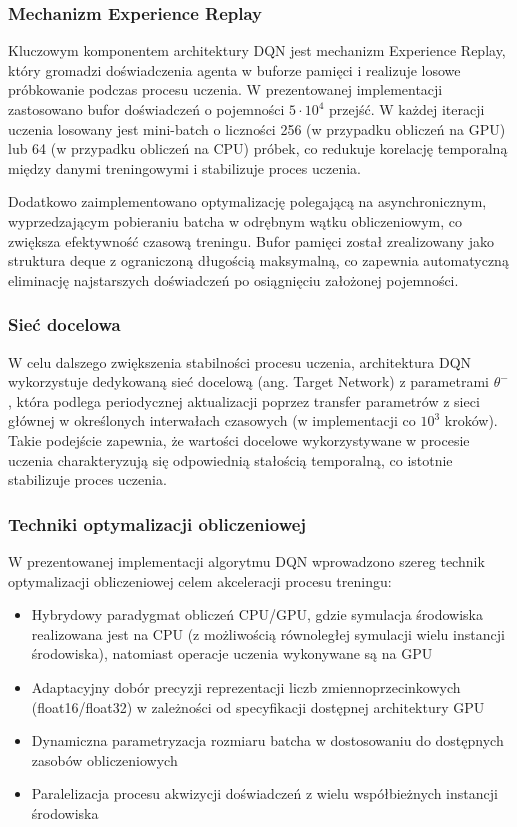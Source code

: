 \documentclass[a4paper,12pt]{article}
\begin{document}
\subsubsection*{Mechanizm Experience Replay}

Kluczowym komponentem architektury DQN jest mechanizm Experience Replay, który gromadzi doświadczenia agenta w buforze pamięci i realizuje losowe próbkowanie podczas procesu uczenia. W prezentowanej implementacji zastosowano bufor doświadczeń o pojemności \(5 \cdot 10^4\) przejść. W każdej iteracji uczenia losowany jest mini-batch o liczności 256 (w przypadku obliczeń na GPU) lub 64 (w przypadku obliczeń na CPU) próbek, co redukuje korelację temporalną między danymi treningowymi i stabilizuje proces uczenia. 

Dodatkowo zaimplementowano optymalizację polegającą na asynchronicznym, wyprzedzającym pobieraniu batcha w odrębnym wątku obliczeniowym, co zwiększa efektywność czasową treningu. Bufor pamięci został zrealizowany jako struktura deque z ograniczoną długością maksymalną, co zapewnia automatyczną eliminację najstarszych doświadczeń po osiągnięciu założonej pojemności.

\subsubsection*{Sieć docelowa}

W celu dalszego zwiększenia stabilności procesu uczenia, architektura DQN wykorzystuje dedykowaną sieć docelową (ang. Target Network) z parametrami \(\theta^-\), która podlega periodycznej aktualizacji poprzez transfer parametrów z sieci głównej w określonych interwałach czasowych (w implementacji co \(10^3\) kroków). Takie podejście zapewnia, że wartości docelowe wykorzystywane w procesie uczenia charakteryzują się odpowiednią stałością temporalną, co istotnie stabilizuje proces uczenia.

\subsubsection*{Techniki optymalizacji obliczeniowej}

W prezentowanej implementacji algorytmu DQN wprowadzono szereg technik optymalizacji obliczeniowej celem akceleracji procesu treningu:
\begin{itemize}
\item Hybrydowy paradygmat obliczeń CPU/GPU, gdzie symulacja środowiska realizowana jest na CPU (z możliwością równoległej symulacji wielu instancji środowiska), natomiast operacje uczenia wykonywane są na GPU
\item Adaptacyjny dobór precyzji reprezentacji liczb zmiennoprzecinkowych (float16/float32) w zależności od specyfikacji dostępnej architektury GPU
\item Dynamiczna parametryzacja rozmiaru batcha w dostosowaniu do dostępnych zasobów obliczeniowych
\item Paralelizacja procesu akwizycji doświadczeń z wielu współbieżnych instancji środowiska
\end{itemize}
\end{document}
